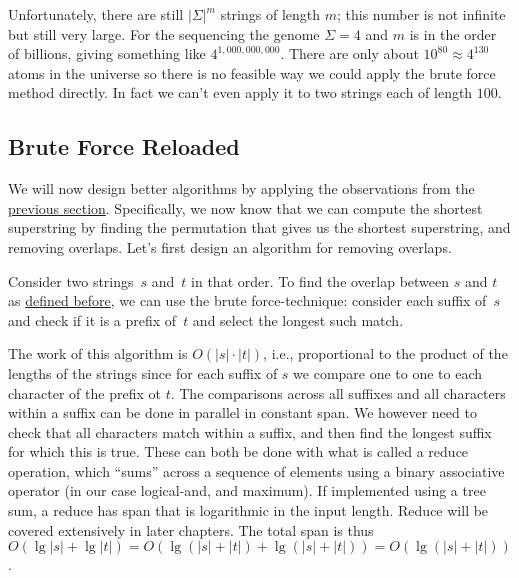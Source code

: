 \begin{note}
Unfortunately, there are still $|\Sigma|^m$ strings of length $m$;
this number is not infinite but still very large.  For the sequencing
the genome $\Sigma = 4$ and $m$ is in the order of billions, giving
something like $4^{1,000,000,000}$.  
%
There are only about $10^{80}
\approx 4^{130}$ atoms in the universe so there is no feasible way we
could apply the brute force method directly.  
%
In fact we can't even apply it to two strings each of length $100$.
\end{note}


\subsection{Brute Force Reloaded}
\label{genome::alg::bf-reloaded}

\begin{gram}
We will now design better algorithms by applying the observations from
the \href{genome::prob::understanding}{previous section}. 
%
Specifically, we now know that we can compute the shortest superstring
by finding the permutation that gives us the shortest superstring, and
removing overlaps.
%
Let's first design an algorithm for removing overlaps.
\end{gram}


\begin{algorithm}
Consider two strings~$s$ and~$t$ in that order.
%
To find the overlap between $s$ and $t$ as
%
%
\href{def:genome::prob::overlap}{defined before},
%
 we can use the brute force-technique:
consider each suffix of~$s$ and check if it is a prefix of~$t$ and
select the longest such match.
%


The work of this algorithm is $O(|s| \cdot |t|)$, i.e., proportional to the product of
the lengths of the strings since for each suffix of $s$ we compare one to
one to each character of the prefix ot $t$.
%
The comparisons across all suffixes and all characters within a suffix can be done in parallel
in constant span.
We however need to check that all characters match within a suffix, and then find the longest suffix for
which this is true.    These can both be done with what is called a reduce operation, which 
``sums'' across a sequence of elements using a binary associative operator (in our case logical-and, and maximum).
If implemented using a tree sum, a reduce has span that is logarithmic in the input length.   Reduce will be covered
extensively in later chapters.
The total span is thus $O(\lg{|s|} + \lg{|t|}) = O(\lg{(|s|+|t|)} + \lg{(|s|+|t|)}) = O(\lg{(|s|+|t|)})$.
\end{algorithm}

